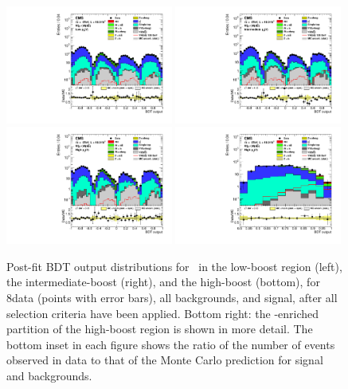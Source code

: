 \documentclass[12pt,twoside,a4paper,cmspaper,final,collab]{cms-tdr}
\begin{document}
\begin{figure}[htbp]
\centering
\includegraphics[width=0.49\textwidth]{BDT_Wln_ch2_Wmunu_PostFit_s.pdf}
\includegraphics[width=0.49\textwidth]{BDT_Wln_ch2_Wmunu2_PostFit_s.pdf}
\includegraphics[width=0.49\textwidth]{BDT_Wln_ch2_Wmunu3_PostFit_s.pdf}
\includegraphics[width=0.49\textwidth]{BDT_Wln_Last_ch2_Wmunu3_PostFit_s.pdf}
   \caption{Post-fit BDT output distributions for \WmnH\ in the
    low-boost region (left),  the intermediate-boost (right), and the
    high-boost  (bottom), for 8\TeV data (points with error bars),
    all backgrounds, and signal, after all selection criteria have been
    applied. Bottom right: the \VH-enriched partition of the high-boost region is
    shown in more detail. The bottom inset in each
      figure shows the ratio of the number of events observed in data to that
      of the Monte Carlo prediction for signal and backgrounds.}
    \label{fig:BDTWln8TeV_mu}
\end{figure}
\end{document}
